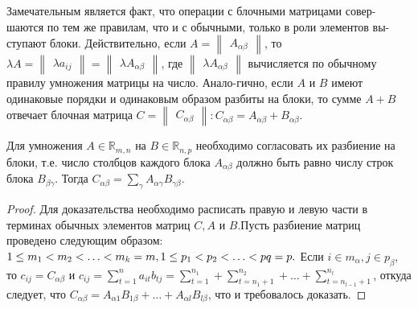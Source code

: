   Замечательным является факт, что операции с блочными матрицами совер-шаются по тем же правилам, что и с обычными, только в роли элементов вы-ступают блоки. Действительно, если
  $A=\begin{Vmatrix}
    A_{\alpha \beta}
  \end{Vmatrix}$, то $\lambda A = \begin{Vmatrix}
\lambda a_{ij}
  \end{Vmatrix} = \begin{Vmatrix}
    \lambda A_{\alpha \beta}
  \end{Vmatrix}$, где $\begin{Vmatrix}
    \lambda A_{\alpha \beta}
  \end{Vmatrix}$ вычисляется по обычному правилу умножения матрицы на число. Анало-гично, если $A$ и $B$ имеют одинаковые порядки и одинаковым образом разбиты на блоки, то сумме $A +B$ отвечает блочная матрица $C=\begin{Vmatrix}
  C_{\alpha \beta}
  \end{Vmatrix} : C_{\alpha \beta} = A_{\alpha \beta} + B_{\alpha \beta}$.

  Для умножения $A \in \mathds{R}_{m,n}$ на $B \in \mathds{R}_{n,p}$ необходимо согласовать их разбиение на блоки, т.е. число столбцов каждого блока $A_{\alpha \beta}$ должно быть равно числу строк блока $B_{\beta \gamma}$. Тогда $C_{\alpha \beta} = \sum \limits_{\gamma} A_{\alpha \gamma} B_{\gamma \beta}$.
  \begin{proof}
Для доказательства необходимо расписать правую и левую части в терминах обычных элементов матриц $C,A$ и $B$.Пусть разбиение матриц проведено следующим образом:
  $1 \leq m_{1} < m_{2} < \dotso < m_{k} = m, 1 \leq p_{1} < p_{2} < \dotso < p{q} = p.\\$
  Если $i \in m_{\alpha}, j \in p_{\beta}$, то $c_{ij}=C_{\alpha \beta}$ и $c_{ij}=\sum \limits_{t=1}^n a_{it}b_{tj} = \sum \limits_{t=1}^{n_{1}} + \sum \limits_{t=n_{1}+1}^{n_{2}} + \dotso + \sum \limits_{t=n_{l-1}+1}^{n_{l}}$, откуда следует, что $ C_{\alpha \beta} = A_{\alpha 1}B_{1 \beta} + \dotso + A_{\alpha l}B_{l \beta}$, что и требовалось доказать.
\end{proof}

